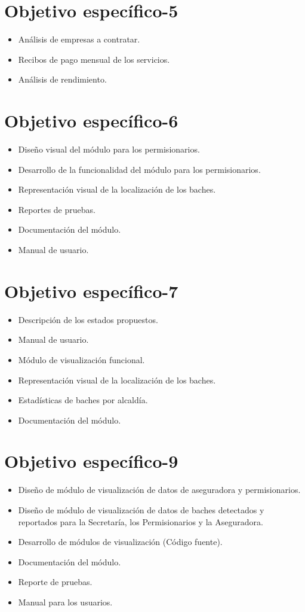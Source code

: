 \section{Objetivo específico-5}
\begin{itemize}
    \item Análisis de empresas a contratar.
    \item Recibos de pago mensual de los servicios.
    \item Análisis de rendimiento.
\end{itemize}

\section{Objetivo específico-6}
\begin{itemize}
    \item Diseño visual del módulo para los permisionarios. 
    \item Desarrollo de la funcionalidad del módulo para los permisionarios.
    \item Representación visual de la localización de los baches.
    \item Reportes de pruebas. 
    \item Documentación del módulo.
    \item Manual de usuario.
\end{itemize}

\section{Objetivo específico-7}
\begin{itemize}
    \item Descripción de los estados propuestos.
    \item Manual de usuario.
    \item Módulo de visualización funcional.
    \item Representación visual de la localización de los baches.
    \item Estadísticas de baches por alcaldía.
    \item Documentación del módulo.
\end{itemize}

\section{Objetivo específico-9}
\begin{itemize}
    \item Diseño de módulo de visualización de datos de aseguradora y permisionarios.
    \item Diseño de módulo de visualización de datos de baches detectados y reportados para la Secretaría, los Permisionarios y la Aseguradora.
    \item Desarrollo de módulos de visualización (Código fuente). 
    \item Documentación del módulo.
    \item Reporte de pruebas.
    \item Manual para los usuarios.    
\end{itemize}